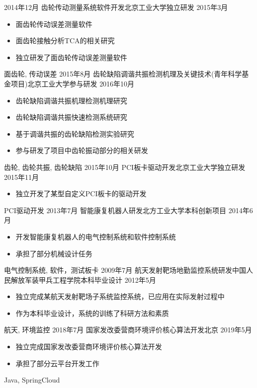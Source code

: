 \begin{experiences}
  \emptySeparator
  \experience
  {2014年12月} {齿轮传动测量系统软件开发}{北京工业大学}{独立研发}
  {2015年3月}    {
				  	\begin{itemize}
				  		\item 面齿轮传动误差测量软件  
				  		\item 面齿轮接触分析TCA的相关研究                
				  		\item 独立研发了面齿轮传动误差测量软件
				  	\end{itemize}
				  }
				  {面齿轮, 传动误差}
	\emptySeparator
  \experience
  {2015年8月} {齿轮缺陷调谐共振检测机理及关键技术(青年科学基金项目)}{北京工业大学}{参与研发}
  {2016年10月}    {
				  	\begin{itemize}
				  		\item 齿轮缺陷调谐共振机理检测机理研究                  
				  		\item 齿轮缺陷调谐共振快速检测系统研究
				  		\item 基于调谐共振的齿轮缺陷检测实验研究
				  		\item 参与研发了项目中齿轮振动部分的相关研发
				  	\end{itemize}
				  }
				  {齿轮, 齿轮共振, 齿轮缺陷}
  \emptySeparator
  \experience
  {2015年10月} {PCI板卡驱动开发}{北京工业大学}{独立研发}
  {2015年11月}    {
				  	\begin{itemize}
				  		\item 独立开发了某型自定义PCI板卡的驱动开发  
				  	\end{itemize}
				  }
          {PCI驱动开发}
  \emptySeparator
  \experience
  {2013年7月} {智能康复机器人研发}{北方工业大学}{本科创新项目}
  {2014年6月}    {
				  	\begin{itemize}
				  		\item 开发智能康复机器人的电气控制系统和软件控制系统
				  		\item 承担了部分机械设计任务
				  	\end{itemize}
				  }
				  {电气控制系统, 软件，测试板卡}
	\emptySeparator
  \experience
  {2009年7月} {航天发射靶场地勤监控系统研发}{中国人民解放军装甲兵工程学院}{本科毕业设计}
  {2012年5月}    {
				  	\begin{itemize}
				  		\item 独立完成某航天发射靶场子系统监控系统，已应用在实际发射过程中
				  		\item 作为本科毕业设计，系统的训练了科研方法和素质
				  	\end{itemize}
				  }
          {航天, 环境监控}
  \emptySeparator
  \experience
  {2018年7月} {国家发改委营商环境评价核心算法开发}{北京}{}
  {2019年5月}    {
				  	\begin{itemize}
				  		\item 独立完成国家发改委营商环境评价核心算法开发
				  		\item 承担了部分云平台开发工作
				  	\end{itemize}
				  }
				  {Java, SpringCloud}
		
\end{experiences}
